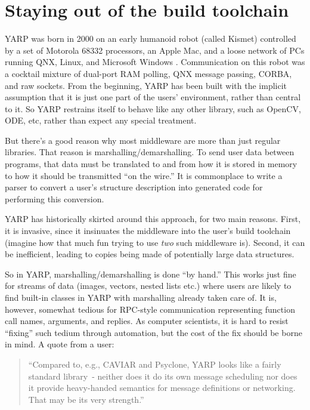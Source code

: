 \documentclass[letterpaper]{article}
\begin{document}
\section{Staying out of the build toolchain}

YARP was born in 2000 on an early humanoid robot (called Kismet)
controlled by a set of Motorola 68332 processors, an Apple Mac, and a
loose network of PCs running QNX, Linux, and Microsoft Windows
\cite{metta06yarp}.  Communication on this robot was a cocktail
mixture of dual-port RAM polling, QNX message passing, CORBA, and raw
sockets.  From the beginning, YARP has been built with the implicit
assumption that it is just one part of the users' environment, rather
than central to it.  So YARP restrains itself to behave like any other
library, such as OpenCV, ODE, etc, rather than expect any special
treatment.

But there's a good reason why most middleware are more than just
regular libraries.  That reason is marshalling/demarshalling.  To send
user data between programs, that data must be translated to and from
how it is stored in memory to how it should be transmitted ``on the
wire.''  It is commonplace to write a parser to convert a user's
structure description into generated code for performing this
conversion.

YARP has historically skirted around this approach, for two main
reasons.  First, it is invasive, since it insinuates the middleware
into the user's build toolchain (imagine how that much fun trying to
use {\it two} such middleware is).  Second, it can be inefficient,
leading to copies being made of potentially large data structures.

So in YARP, marshalling/demarshalling is done ``by hand.''  This works
just fine for streams of data (images, vectors, nested lists etc.)
where users are likely to find built-in classes in YARP with
marshalling already taken care of.  It is, however, somewhat tedious
for RPC-style communication representing function call names,
arguments, and replies.  As computer scientists, it is hard to
resist ``fixing'' such tedium through automation, but the cost
of the fix should be borne in mind.  A quote from a user:

\begin{quote}
``Compared to, e.g., CAVIAR and Psyclone, YARP
looks like a fairly standard library~- neither does it
do its own message scheduling nor does it provide
heavy-handed semantics for message definitions or
networking. That may be its very strength.'' \cite{stefansson09yarp}
\end{quote}
\end{document}
